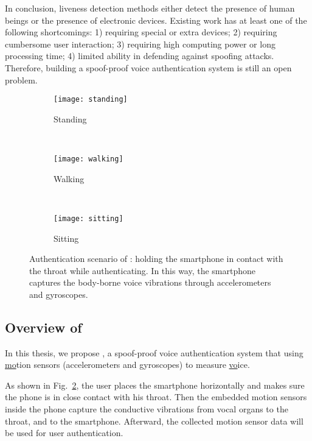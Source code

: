 In conclusion, liveness detection methods either detect the presence of human beings or the presence of electronic devices. Existing work has at least one of the following shortcomings: 1) requiring special or extra devices; 2) requiring cumbersome user interaction; 3) requiring high computing power or long processing time; 4) limited ability in defending against spoofing attacks. Therefore, building a spoof-proof voice authentication system is still an open problem.



\begin{figure}[!h]
	\centering
	\begin{subfigure}[b]{0.15\textwidth}
		\centering
		\texttt{[image: standing]}
		\caption{Standing}
	\end{subfigure}%
	~~~\qquad
	\begin{subfigure}[b]{0.15\textwidth}
		\centering
		\texttt{[image: walking]}
		\caption{Walking}
	\end{subfigure}
	~~~\qquad
	\begin{subfigure}[b]{0.15\textwidth}
		\centering
		\texttt{[image: sitting]}
		\caption{Sitting}\label{fig:usec}
	\end{subfigure}
	\caption[Authentication Scenario of {\shortname}]{Authentication scenario of {\shortname}: holding the smartphone in contact with the throat while authenticating. In this way, the smartphone captures the body-borne voice vibrations through accelerometers and gyroscopes.}
	\label{fig:use}
\end{figure}


\subsection{Overview of {\shortname}}

In this thesis, we propose {\shortname}, a spoof-proof voice authentication system that using \underline{mo}tion sensors (accelerometers and gyroscopes) to measure \underline{vo}ice.


As shown in Fig.~\ref{fig:use}, the user places the smartphone horizontally and makes sure the phone is in close contact with his throat. Then the embedded motion sensors inside the phone capture the conductive vibrations from vocal organs to the throat, and to the smartphone. Afterward, the collected motion sensor data will be used for user authentication.


